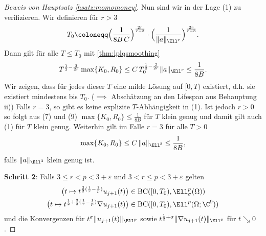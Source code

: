 \begin{proof}[Beweis von Hauptsatz \ref{hsatz:momomoney}]
  Nun sind wir in der Lage (1) zu verifizieren.
  Wir definieren für $r > 3$
  $$
  T_0 \coloneqq \Big(\frac{1}{8 B\, C} \Big)^{\frac{2r}{r - 3}} \cdot \Big( \frac{1}{\|a\|_{\Ell^r}} \Big)^{\frac{2r}{r - 3}}.
  $$
  Dann gilt für alle $T \leq T_0$ mit \ref{thm:lplqsmoothing}
  $$
  T^{\frac{1}{2} - \frac{3}{2r}} \max \{K_0, R_0\} \leq C\, T_0^{\frac{1}{2} - \frac{3}{2r}} \|a\|_{\Ell^r} \leq \frac{1}{8B}.
  $$
  Wir zeigen, dass für jedes dieser $T$ eine milde Lösung auf $[0,T)$ existiert, d.h. sie existiert mindestens bis $T_0$. ($\implies $ Abschätzung an den Lifespan aus Behauptung ii))
  Falls $r = 3$, so gibt es keine explizite $T$-Abhängigkeit in (1).
  Ist jedoch $r > 0$ so folgt aus (7) und (9) $\max\{K_0, R_0\} \leq \frac{1}{8B}$ für $T$ klein genug und damit gilt auch (1) für $T$ klein genug.
  Weiterhin gilt im Falle $r = 3$ für alle $T > 0$
  $$
  \max\{K_0, R_0 \} \leq C\, \|a\|_{\Ell^3} \leq \frac{1}{8B},
  $$
  falls $\|a\|_{\Ell^3}$ klein genug ist.

  \textbf{Schritt 2}: Falls $3 \leq r < p < 3 + \varepsilon$ und $3 < r \leq p < 3 + \varepsilon$ gelten
  \begin{align*}
    \big( t \mapsto t^{\frac{3}{2}(\frac{1}{r} - \frac{1}{p})} u_{j + 1}(t) \big) &\in \mathrm{BC}([0,T_0), \Ell^p_\sigma(\Omega)) \\
      \big( t \mapsto t^{\frac{1}{2} + \frac{3}{2}(\frac{1}{r} - \frac{1}{p})} \nabla u_{j + 1}(t) \big) &\in \mathrm{BC}([0,T_0), \Ell^p(\Omega; \C^9)) 
  \end{align*}
  und die Konvergenzen für $t^\sigma \|u_{j + 1} (t) \|_{\Ell^p}$ sowie $t^{\frac{1}{2} + \sigma} \|\nabla u_{j + 1}(t) \|_{\Ell^p}$ für $t \searrow 0$.
  

\end{proof}

